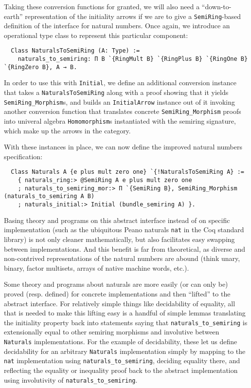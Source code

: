 \documentclass[a4paper,10pt,runningheads]{llncs}
\begin{document}
Taking these conversion functions for granted, we will also need a ``down-to-earth'' representation of the initiality arrows if we are to give a \lstinline|SemiRing|-based definition of the interface for natural numbers. Once again, we introduce an operational type class to represent this particular component:
\begin{lstlisting}
  Class NaturalsToSemiRing (A: Type) :=
    naturals_to_semiring: Π B `{RingMult B} `{RingPlus B} `{RingOne B} `{RingZero B}, A → B.
\end{lstlisting}
In order to use this with \lstinline|Initial|, we define an additional conversion instance that takes a \lstinline|NaturalsToSemiRing| along with a proof showing that it yields \lstinline|SemiRing_Morphism|s, and builds an \lstinline|InitialArrow| instance out of it invoking another conversion function that translates concrete \lstinline|SemiRing_Morphism| proofs into univeral algebra \lstinline|Homomorphism|s instantiated with the semiring signature, which make up the arrows in the category.

With these instances in place, we can now define the improved natural numbers specification:
\begin{lstlisting}
  Class Naturals A {e plus mult zero one} `{!NaturalsToSemiRing A} :=
    { naturals_ring:> @SemiRing A e plus mult zero one
    ; naturals_to_semiring_mor:> Π `{SemiRing B}, SemiRing_Morphism (naturals_to_semiring A B)
    ; naturals_initial:> Initial (bundle_semiring A) }.
\end{lstlisting}
Basing theory and programs on this abstract interface instead of on specific implementation (such as the ubiquitous Peano naturals \lstinline|nat| in the Coq standard library) is not only cleaner mathematically, but also facilitates easy swapping between implementations. And this benefit is far from theoretical, as diverse and non-contrived representations of the natural numbers are abound (think unary, binary, factor multisets,
arrays of native machine words, etc.).

Some theory and programs about naturals are more easily (or can only be) proved (resp. defined) for concrete implementations and then ``lifted'' to the abstract interface. For relatively simple things like decidability of equality, all that is needed to make this lifting easy is a handful of simple lemmas translating the initiality property back into statements saying that \lstinline|naturals_to_semiring| is extensionally equal to other semiring morphisms and involutive between \lstinline|Naturals| implementations. For the example of decidability, these let us define decidability for an arbitrary \lstinline|Naturals| implementation simply by mapping to the \lstinline|nat| implementation using \lstinline|naturals_to_semiring|, deciding equality there, and reflecting the equality or inequality proof back to the abstract implementation using involutivity of \lstinline|naturals_to_semiring|.
\end{document}
